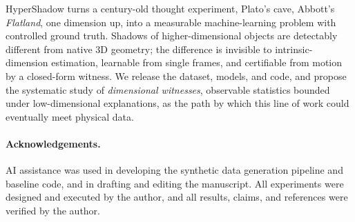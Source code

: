 \documentclass{article}
\begin{document}
HyperShadow turns a century-old thought experiment, Plato's cave, Abbott's \emph{Flatland}, one dimension up, into a measurable machine-learning problem with controlled ground truth. Shadows of higher-dimensional objects are detectably different from native 3D geometry; the difference is invisible to intrinsic-dimension estimation, learnable from single frames, and certifiable from motion by a closed-form witness. We release the dataset, models, and code, and propose the systematic study of \emph{dimensional witnesses}, observable statistics bounded under low-dimensional explanations, as the path by which this line of work could eventually meet physical data.

\paragraph{Acknowledgements.} AI assistance was used in developing the synthetic data generation pipeline and baseline code, and in drafting and editing the manuscript. All experiments were designed and executed by the author, and all results, claims, and references were verified by the author.
\end{document}
